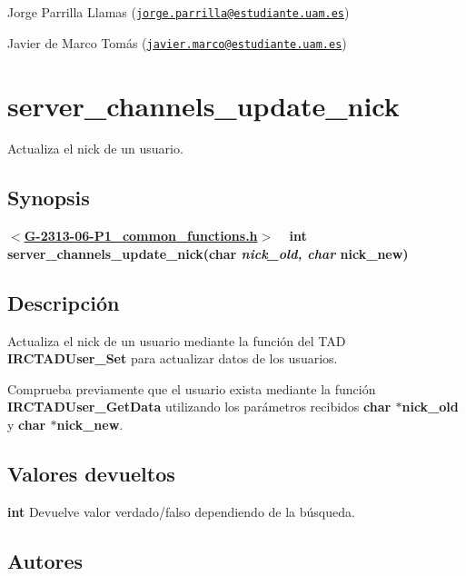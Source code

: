 \begin{DoxyItemize}
\item Jorge Parrilla Llamas (\href{mailto:jorge.parrilla@estudiante.uam.es}{\tt jorge.\+parrilla@estudiante.\+uam.\+es}) 
\item Javier de Marco Tomás (\href{mailto:javier.marco@estudiante.uam.es}{\tt javier.\+marco@estudiante.\+uam.\+es}) 
\end{DoxyItemize}\hypertarget{server_channels_update_nick}{}\section{server\+\_\+channels\+\_\+update\+\_\+nick}\label{server_channels_update_nick}
Actualiza el nick de un usuario.\hypertarget{server_channels_update_nick_synopsis_server_channels_update_nick}{}\subsection{Synopsis}\label{server_channels_update_nick_synopsis_server_channels_update_nick}
{ {\bfseries $<$\hyperlink{G-2313-06-P1__common__functions_8h}{G-\/2313-\/06-\/\+P1\+\_\+common\+\_\+functions.\+h}$>$} ~\newline
 {\bfseries int server\+\_\+channels\+\_\+update\+\_\+nick(char {\itshape nick\+\_\+old, char} nick\+\_\+new)} } \hypertarget{server_channels_update_nick_descripcion_server_channels_update_nick}{}\subsection{Descripción}\label{server_channels_update_nick_descripcion_server_channels_update_nick}
Actualiza el nick de un usuario mediante la función del T\+A\+D {\bfseries I\+R\+C\+T\+A\+D\+User\+\_\+\+Set} para actualizar datos de los usuarios. 

Comprueba previamente que el usuario exista mediante la función {\bfseries I\+R\+C\+T\+A\+D\+User\+\_\+\+Get\+Data} utilizando los parámetros recibidos {\bfseries char $\ast$nick\+\_\+old} y {\bfseries char $\ast$nick\+\_\+new}.\hypertarget{server_channels_update_nick_return_server_channels_update_nick}{}\subsection{Valores devueltos}\label{server_channels_update_nick_return_server_channels_update_nick}

\begin{DoxyItemize}
\item {\bfseries int} Devuelve valor verdado/falso dependiendo de la búsqueda. 
\end{DoxyItemize}\hypertarget{server_channels_update_nick_authors_server_channels_update_nick}{}\subsection{Autores}\label{server_channels_update_nick_authors_server_channels_update_nick}

